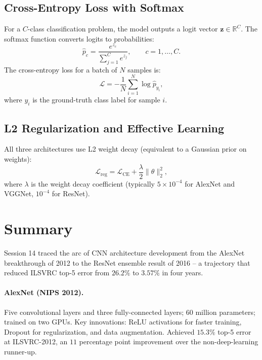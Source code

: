 \documentclass[12pt,a4paper]{article}
\begin{document}
\subsection{Cross-Entropy Loss with Softmax}

For a $C$-class classification problem, the model outputs a logit vector $\mathbf{z} \in \mathbb{R}^C$. The softmax function converts logits to probabilities:
\begin{equation}
  \hat{p}_c = \frac{e^{z_c}}{\sum_{j=1}^{C} e^{z_j}},
  \qquad c = 1, \ldots, C.
  \label{eq:softmax}
\end{equation}
The cross-entropy loss for a batch of $N$ samples is:
\begin{equation}
  \mathcal{L} = -\frac{1}{N} \sum_{i=1}^{N} \log \hat{p}_{y_i},
  \label{eq:ce_loss}
\end{equation}
where $y_i$ is the ground-truth class label for sample $i$.

\subsection{L2 Regularization and Effective Learning}

All three architectures use L2 weight decay (equivalent to a Gaussian prior on weights):
\begin{equation}
  \mathcal{L}_{\text{reg}} = \mathcal{L}_{\text{CE}} + \frac{\lambda}{2} \|\theta\|^2_2,
  \label{eq:l2_reg}
\end{equation}
where $\lambda$ is the weight decay coefficient (typically $5\times10^{-4}$ for AlexNet and VGGNet, $10^{-4}$ for ResNet).

\section{Summary}
\label{sec:summary}

Session 14 traced the arc of CNN architecture development from the AlexNet breakthrough of 2012 to the ResNet ensemble result of 2016 -- a trajectory that reduced ILSVRC top-5 error from $26.2\%$ to $3.57\%$ in four years.

\paragraph{AlexNet (NIPS 2012).}
Five convolutional layers and three fully-connected layers; 60 million parameters; trained on two GPUs. Key innovations: ReLU activations for faster training, Dropout for regularization, and data augmentation. Achieved $15.3\%$ top-5 error at ILSVRC-2012, an $11$ percentage point improvement over the non-deep-learning runner-up.
\end{document}
